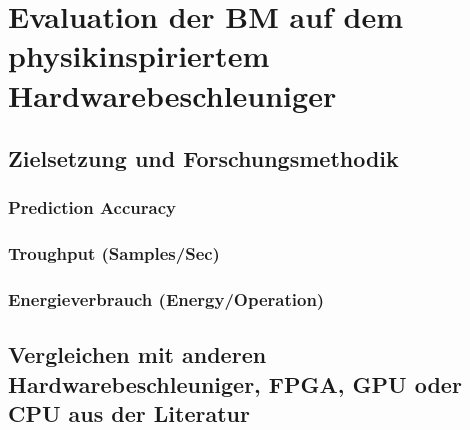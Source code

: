 \chapter{Evaluation der BM auf dem physikinspiriertem Hardwarebeschleuniger}
\section{Zielsetzung und Forschungsmethodik}
\subsection{Prediction Accuracy}
\subsection{Troughput (Samples/Sec)}
\subsection{Energieverbrauch (Energy/Operation)}
\section{Vergleichen mit anderen Hardwarebeschleuniger, FPGA, GPU oder CPU aus der Literatur}
